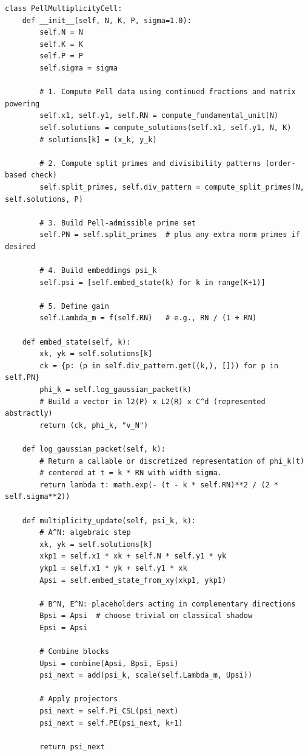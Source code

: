 \documentclass[11pt]{article}
\begin{document}
\begin{verbatim}
class PellMultiplicityCell:
    def __init__(self, N, K, P, sigma=1.0):
        self.N = N
        self.K = K
        self.P = P
        self.sigma = sigma

        # 1. Compute Pell data using continued fractions and matrix powering
        self.x1, self.y1, self.RN = compute_fundamental_unit(N)
        self.solutions = compute_solutions(self.x1, self.y1, N, K)
        # solutions[k] = (x_k, y_k)

        # 2. Compute split primes and divisibility patterns (order-based check)
        self.split_primes, self.div_pattern = compute_split_primes(N, self.solutions, P)

        # 3. Build Pell-admissible prime set
        self.PN = self.split_primes  # plus any extra norm primes if desired

        # 4. Build embeddings psi_k
        self.psi = [self.embed_state(k) for k in range(K+1)]

        # 5. Define gain
        self.Lambda_m = f(self.RN)   # e.g., RN / (1 + RN)

    def embed_state(self, k):
        xk, yk = self.solutions[k]
        ck = {p: (p in self.div_pattern.get((k,), [])) for p in self.PN}
        phi_k = self.log_gaussian_packet(k)
        # Build a vector in l2(P) x L2(R) x C^d (represented abstractly)
        return (ck, phi_k, "v_N")

    def log_gaussian_packet(self, k):
        # Return a callable or discretized representation of phi_k(t)
        # centered at t = k * RN with width sigma.
        return lambda t: math.exp(- (t - k * self.RN)**2 / (2 * self.sigma**2))

    def multiplicity_update(self, psi_k, k):
        # A^N: algebraic step
        xk, yk = self.solutions[k]
        xkp1 = self.x1 * xk + self.N * self.y1 * yk
        ykp1 = self.x1 * yk + self.y1 * xk
        Apsi = self.embed_state_from_xy(xkp1, ykp1)

        # B^N, E^N: placeholders acting in complementary directions
        Bpsi = Apsi  # choose trivial on classical shadow
        Epsi = Apsi

        # Combine blocks
        Upsi = combine(Apsi, Bpsi, Epsi)
        psi_next = add(psi_k, scale(self.Lambda_m, Upsi))

        # Apply projectors
        psi_next = self.Pi_CSL(psi_next)
        psi_next = self.PE(psi_next, k+1)

        return psi_next
\end{verbatim}
\end{document}
